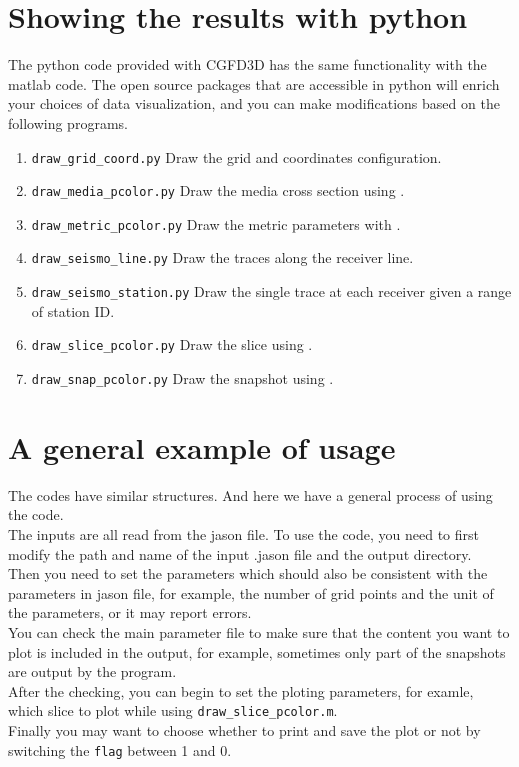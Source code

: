 \section{Showing the results with python}
The python code provided with CGFD3D has the same functionality with the matlab code. The open source packages that are accessible in python will enrich your choices of data visualization, and you can make modifications based on the following programs.   
\begin{enumerate}
\item \texttt{draw\_grid\_coord.py} Draw the grid and coordinates configuration.
\item \texttt{draw\_media\_pcolor.py} Draw the media cross section using . 
\item \texttt{draw\_metric\_pcolor.py} Draw the metric parameters with .
\item \texttt{draw\_seismo\_line.py} Draw the traces along the receiver line.
\item \texttt{draw\_seismo\_station.py} Draw the single trace at each receiver given a range of station ID.
\item \texttt{draw\_slice\_pcolor.py} Draw the slice using .
\item \texttt{draw\_snap\_pcolor.py} Draw the snapshot using .
\end{enumerate}
\section{A general example of usage}
The codes have similar structures. And here we have a general process of using the code.\\ 
The inputs are all read from the jason file. To use the code, you need to first modify the path and name of the input .jason file and the output directory.\\ 
Then you need to set the parameters which should also be consistent with the parameters in jason file, for example, the number of grid points and the unit of the parameters, or it may report errors.\\ 
You can check the main parameter file to make sure that the content you want to plot is included in the output, for example, sometimes only part of the snapshots are output by the program.\\ 
After the checking, you can begin to set the ploting parameters, for examle, which slice to plot while using \texttt{draw\_slice\_pcolor.m}.\\ 
Finally you may want to choose whether to print and save the plot or not by switching the \texttt{flag} between 1 and 0. 
  